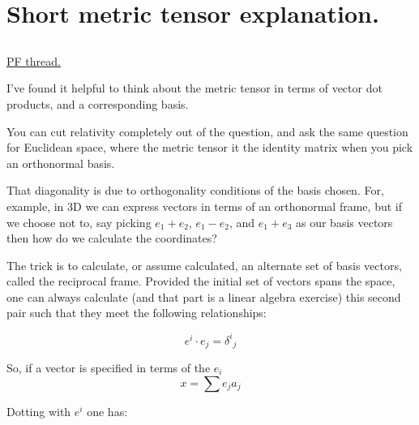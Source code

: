 
%


\chapter{Short metric tensor explanation.}
\date{August 30, 2008}

%


\section{}

\href{http://www.physicsforums.com/showthread.php?p=1853416}{PF thread.}

I've found it helpful to think about the metric tensor in terms of vector dot products, and a corresponding basis.  

You can cut relativity completely out of the question, and ask the same question for Euclidean space, where the metric tensor it the identity matrix when you pick an orthonormal basis.

That diagonality is due to orthogonality conditions of the basis chosen.  For, example, in 3D we can express vectors in terms of an
orthonormal frame, but if we choose not to, say picking $e_1 + e_2$, $e_1-e_2$, and $e_1 + e_3$ as our basis vectors then how do we calculate the coordinates?

The trick is to calculate, or assume calculated, an alternate set of basis vectors, called the reciprocal frame.  Provided the initial set of vectors spans the space, one can always calculate (and that part is a linear algebra exercise) this second pair such that they meet the following relationships:

\begin{equation*}
e^i \cdot e_j = {\delta^i}_j
\end{equation*}

So, if a vector is specified in terms of the $e_i$
\begin{equation*}
x = \sum e_j a_j
\end{equation*}

Dotting with $e^i$ one has:

